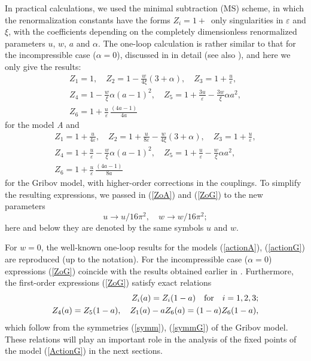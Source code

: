 \documentclass[12pt]{article}
\begin{document}
In practical calculations, we used the minimal subtraction (MS) scheme,
in which the renormalization constants have the forms $Z_{i}=1+\,$ only
singularities in $\varepsilon$ and $\xi$, with the coefficients depending
on the completely dimensionless renormalized parameters $u$, $w$, $a$ and
$\alpha$. The one-loop calculation is rather similar to that for the
incompressible case ($\alpha=0$), discussed in \cite{AIK} in detail
(see also \cite{AHH,Alexa}), and here we only give the results:
\begin{eqnarray}
Z_{1} = 1, \quad  Z_{2} = 1 - \frac{w}{4\xi}(3+\alpha), \quad
Z_{3} = 1 + \frac{u}{\varepsilon}, \nonumber \\
Z_{4} = 1 - \frac{w}{\xi} \alpha (a-1)^{2} , \quad
Z_{5} = 1 + \frac{3u}{\varepsilon} - \frac{3w}{\xi} \alpha a^{2},
\nonumber \\
Z_{6} = 1 + \frac{u}{\varepsilon}\, \frac{(4a-1)}{4a}
\label{ZoA}
\end{eqnarray}
for the model {\it A} and
\begin{eqnarray}
Z_{1} = 1 + \frac{u}{4\varepsilon}, \quad
Z_{2} = 1 + \frac{u}{8\varepsilon} - \frac{w}{4\xi}(3+\alpha), \quad
Z_{3} = 1 + \frac{u}{\varepsilon}, \nonumber \\
Z_{4} = 1 + \frac{u}{\varepsilon} - \frac{w}{\xi} \alpha (a-1)^{2} , \quad
Z_{5} = 1 + \frac{u}{\varepsilon} - \frac{w}{\xi} \alpha a^{2}, \nonumber \\
Z_{6} = 1 + \frac{u}{\varepsilon}\, \frac{(4a-1)}{8a}
\label{ZoG}
\end{eqnarray}
for the Gribov model, with higher-order corrections in the couplings.
To simplify the resulting expressions, we passed in (\ref{ZoA})
and (\ref{ZoG}) to the new parameters
\[ u \to u/16\pi^2, \quad w \to w/16\pi^2; \]
here and below they are denoted by the same symbols $u$ and $w$.

For $w=0$, the well-known one-loop results for the models (\ref{actionA}),
(\ref{actionG}) are reproduced (up to the notation). For the incompressible
case ($\alpha=0$) expressions (\ref{ZoG}) coincide with the results obtained
earlier in \cite{AIK}. Furthermore, the first-order expressions (\ref{ZoG})
satisfy exact relations
\begin{eqnarray}
Z_{i} (a) = Z_{i} (1-a) \quad {\rm for} \quad i=1,2,3; \nonumber \\
Z_{4} (a) = Z_{5} (1-a), \quad
Z_{1} (a) -a Z_{6}(a) = (1-a) Z_{6}(1-a),
\label{GSymm}
\end{eqnarray}
which follow from the symmetries (\ref{symm}), (\ref{symmG}) of the Gribov
model. These relations will play an important role in the analysis of the
fixed points of the model (\ref{ActionG}) in the next sections.
\end{document}
